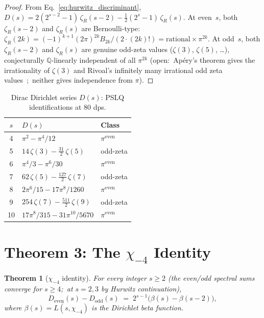 \documentclass[11pt]{article}
\newtheorem{theorem}{Theorem}
\begin{document}
\begin{proof}
From Eq.~\eqref{eq:hurwitz_discriminant},
$D(s) = 2(2^{s-2} - 1)\,\zeta_R(s{-}2)
       - \tfrac{1}{2}(2^s - 1)\,\zeta_R(s)$.
At even~$s$, both $\zeta_R(s{-}2)$ and $\zeta_R(s)$ are Bernoulli-type:
$\zeta_R(2k) = (-1)^{k+1} (2\pi)^{2k} B_{2k} / (2 \cdot (2k)!)
= \mathrm{rational} \times \pi^{2k}$.  At odd~$s$, both
$\zeta_R(s{-}2)$ and $\zeta_R(s)$ are genuine odd-zeta values
($\zeta(3)$, $\zeta(5)$, \ldots), conjecturally $\mathbb{Q}$-linearly
independent of all $\pi^{2k}$ (open:\ Ap\'ery's theorem gives the
irrationality of $\zeta(3)$ and Rivoal's infinitely many irrational odd
zeta values~\cite{apery1979,rivoal2000};\ neither gives independence
from $\pi$).
\end{proof}

\begin{table}[h]
\centering
\caption{Dirac Dirichlet series $D(s)$: PSLQ identifications at 80 dps.}
\label{tab:D_values}
\begin{tabular}{@{}cll@{}}
\toprule
$s$ & $D(s)$ & Class \\
\midrule
4 & $\pi^2 - \pi^4/12$ & $\pi^{\mathrm{even}}$ \\
5 & $14\,\zeta(3) - \tfrac{31}{2}\,\zeta(5)$ & odd-zeta \\
6 & $\pi^4/3 - \pi^6/30$ & $\pi^{\mathrm{even}}$ \\
7 & $62\,\zeta(5) - \tfrac{127}{2}\,\zeta(7)$ & odd-zeta \\
8 & $2\pi^6/15 - 17\pi^8/1260$ & $\pi^{\mathrm{even}}$ \\
9 & $254\,\zeta(7) - \tfrac{511}{2}\,\zeta(9)$ & odd-zeta \\
10 & $17\pi^8/315 - 31\pi^{10}/5670$ & $\pi^{\mathrm{even}}$ \\
\bottomrule
\end{tabular}
\end{table}

\section{Theorem 3: The $\chi_{-4}$ Identity}
\label{sec:chi4}

\begin{theorem}[$\chi_{-4}$ identity]
\label{thm:chi4}
For every integer $s \ge 2$ (the even/odd spectral sums converge for $s \ge 4$;\ at $s = 2, 3$ by Hurwitz continuation),
\begin{equation}
  D_{\mathrm{even}}(s) - D_{\mathrm{odd}}(s)
    \;=\; 2^{s-1}\bigl(\beta(s) - \beta(s{-}2)\bigr),
  \label{eq:D_diff_closed}
\end{equation}
where $\beta(s) = L(s, \chi_{-4})$ is the Dirichlet beta function.
\end{theorem}
\end{document}
